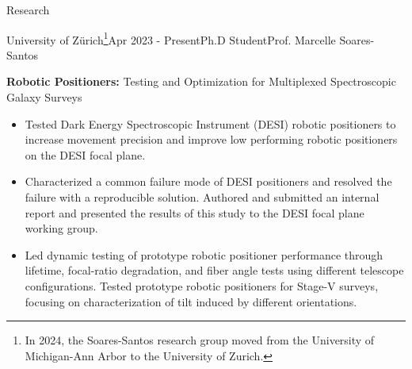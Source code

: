 \documentclass{resume} %
\begin{document}
\begin{rSection}{Research}
\begin{rSubsection}{University of Zürich\footnote{In 2024, the Soares-Santos research group moved from the University of Michigan-Ann Arbor to the University of Zurich.}}{Apr 2023 - Present}{Ph.D Student}{Prof. Marcelle Soares-Santos}
    \item \textbf{Robotic Positioners:} Testing and Optimization for Multiplexed Spectroscopic Galaxy Surveys
    \begin{itemize}
        \item Tested Dark Energy Spectroscopic Instrument (DESI) robotic positioners to increase movement precision and improve low performing robotic positioners on the DESI focal plane. 
        \item Characterized a common failure mode of DESI positioners and resolved the failure with a reproducible solution. Authored and submitted an internal report and presented the results of this study to the DESI focal plane working group. 
        \item Led dynamic testing of prototype robotic positioner performance through lifetime, focal-ratio degradation, and fiber angle tests using different telescope configurations. Tested prototype robotic positioners for Stage-V surveys, focusing on characterization of tilt induced by different orientations.
    \end{itemize}
\end{rSubsection}




\end{rSection}
\end{document}
